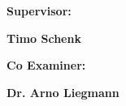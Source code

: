 \documentclass[12pt]{report}
\begin{document}
\begin{titlepage}
{\begin{minipage}[t]{0.47\textwidth}
                \large \textbf {Supervisor:}\\
            \end{minipage}
            \hfill
            \begin{minipage}[t]{0.47\textwidth}
                \raggedleft
                \large \textbf {Timo Schenk}\\
            \end{minipage}
            \begin{minipage}[t]{0.47\textwidth}
                \large \textbf {Co Examiner:}\\
            \end{minipage}
            \hfill
            \begin{minipage}[t]{0.47\textwidth}
                \raggedleft
                \large \textbf {Dr. Arno Liegmann}\\
            \end{minipage}
            \vfill
        }
        \clearpage
        \restoregeometry
    \end{titlepage}
    \newpage
    \hspace{10cm}
    \newpage
    \vspace*{5em}
\end{document}
